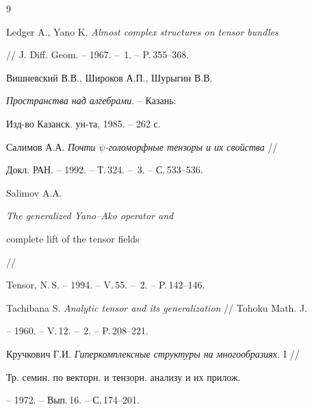 \begin{thebibliography}{9}







Ledger A., Yano K. {\em Almost complex structures on tensor bundles}


// J. Diff. Geom. -- 1967. -- \No\,1. -- P.\,355--368.




Вишневский В.В., Широков А.П., Шурыгин В.В.


{\em Пространства над алгебрами}. -- Казань:


Изд-во Казанск. ун-та, 1985. -- 262 с.




Салимов А.А. {\em Почти $\psi$-голоморфные тензоры и их свойства} //


Докл. РАН. -- 1992. -- Т.\,324. -- \No\,3. -- С.\,533--536.




Salimov A.A. {\em The generalized Yano--Ako operator and


complete lift of the tensor fields} //


Tensor, N.\,S. -- 1994. -- V.\,55. -- \No\,2. -- P.\,142--146.




Tachibana S. {\em Analytic tensor and its generalization} // Tohoku Math. J.


-- 1960. -- V.\,12. -- \No\,2. -- P.\,208--221.




Кручкович Г.И. {\em Гиперкомплексные структуры на многообразиях.} I //


Тр. семин. по векторн. и тензорн. анализу и их прилож.


-- 1972. -- Вып.\,16. -- С.\,174--201.





\end{thebibliography}





\vskip 2cm











\label{end}





